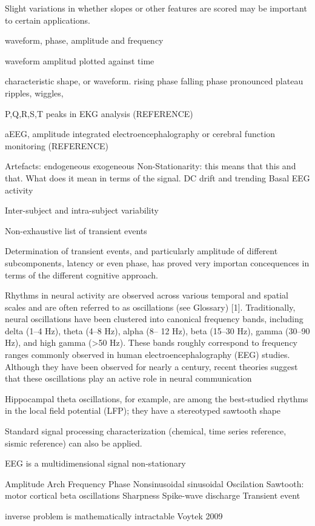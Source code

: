 \documentclass[sensors,article,submit,moreauthors,pdftex,10pt,a4paper]{mdpi}
\begin{document}
Slight variations in whether slopes or other features are scored may be important to certain applications.

waveform, phase, amplitude and frequency

waveform amplitud plotted against time

characteristic shape, or waveform.
rising phase
falling phase
pronounced plateau
ripples, wiggles, 

P,Q,R,S,T peaks in EKG analysis (REFERENCE) 

aEEG, amplitude integrated electroencephalography or cerebral function monitoring (REFERENCE)

Artefacts: endogeneous exogeneous
Non-Stationarity: this means that this and that.  What does it mean in terms of the signal.
DC drift and trending
Basal EEG activity

Inter-subject and intra-subject variability

Non-exhaustive list of transient events

Determination of transient events, and particularly amplitude of different subcomponents, latency or even phase, has proved very importan concequences in terms of the different cognitive approach.

Rhythms in neural activity are observed across various temporal and spatial scales and are often
referred to as oscillations (see Glossary) [1]. Traditionally, neural oscillations have been
clustered into canonical frequency bands, including delta (1–4 Hz), theta (4–8 Hz), alpha (8–
12 Hz), beta (15–30 Hz), gamma (30–90 Hz), and high gamma (>50 Hz). These bands roughly
correspond to frequency ranges commonly observed in human electroencephalography (EEG)
studies. Although they have been observed for nearly a century, recent theories suggest that
these oscillations play an active role in neural communication


 Hippocampal theta oscillations, for example, are among
the best-studied rhythms in the local field potential (LFP); they have a stereotyped sawtooth
shape

Standard signal processing characterization (chemical, time series reference, sismic reference) can also be applied.


EEG is a multidimensional signal non-stationary 

Amplitude
Arch
Frequency
Phase
Nonsinusoidal sinusoidal
Oscilation
Sawtooth: motor cortical beta oscillations
Sharpness
Spike-wave discharge
Transient event

inverse problem is mathematically intractable Voytek 2009
\end{document}
